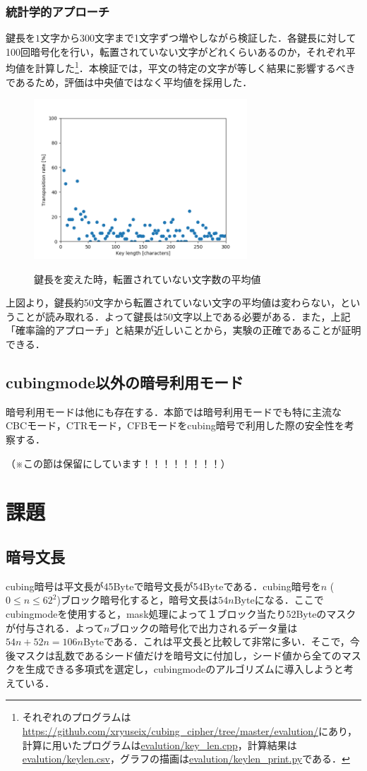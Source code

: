 \documentclass[titlepage]{jarticle}
\begin{document}
\subsubsection{統計学的アプローチ}
鍵長を\(1\)文字から\(300\)文字まで1文字ずつ増やしながら検証した．各鍵長に対して100回暗号化を行い，転置されていない文字がどれくらいあるのか，それぞれ平均値を計算した\footnote{それぞれのプログラムは\url{https://github.com/xryuseix/cubing_cipher/tree/master/evalution/}にあり，計算に用いたプログラムは\url{evalution/key_len.cpp}，計算結果は\url{evalution/keylen.csv}，グラフの描画は\url{evalution/keylen_print.py}である．}．本検証では，平文の特定の文字が等しく結果に影響するべきであるため，評価は中央値ではなく平均値を採用した．
\begin{figure}
  \centering
  \includegraphics[width=8cm]{./tex_pic/figure.png}\\
  \caption{鍵長を変えた時，転置されていない文字数の平均値}
\end{figure}
上図より，鍵長約50文字から転置されていない文字の平均値は変わらない，ということが読み取れる．よって鍵長は50文字以上である必要がある．また，上記「確率論的アプローチ」と結果が近しいことから，実験の正確であることが証明できる．

\subsection{cubingmode以外の暗号利用モード}
暗号利用モードは他にも存在する．本節では暗号利用モードでも特に主流なCBCモード，CTRモード，CFBモードをcubing暗号で利用した際の安全性を考察する．

（※この節は保留にしています！！！！！！！！）

\section{課題}
\subsection{暗号文長}
cubing暗号は平文長が45Byteで暗号文長が54Byteである．cubing暗号を\(n\) (\(0 \leq n \leq 62^2\))ブロック暗号化すると，暗号文長は\(54n\)Byteになる．ここでcubingmodeを使用すると，mask処理によって１ブロック当たり52Byteのマスクが付与される．よって\(n\)ブロックの暗号化で出力されるデータ量は\(54n+52n=106n\)Byteである．これは平文長と比較して非常に多い．そこで，今後マスクは乱数であるシード値だけを暗号文に付加し，シード値から全てのマスクを生成できる多項式を選定し，cubingmodeのアルゴリズムに導入しようと考えている．
\end{document}
